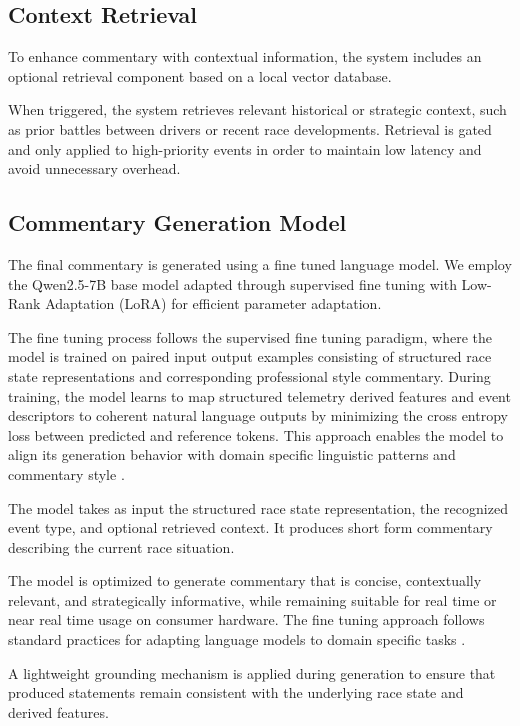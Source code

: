 \subsection{Context Retrieval}

To enhance commentary with contextual information, the system includes an optional retrieval component based on a local vector database.

When triggered, the system retrieves relevant historical or strategic context, such as prior battles between drivers or recent race developments. Retrieval is gated and only applied to high-priority events in order to maintain low latency and avoid unnecessary overhead.

\subsection{Commentary Generation Model}

The final commentary is generated using a fine tuned language model. We employ the Qwen2.5-7B base model adapted through supervised fine tuning with Low-Rank Adaptation (LoRA) for efficient parameter adaptation.

The fine tuning process follows the supervised fine tuning paradigm, where the model is trained on paired input output examples consisting of structured race state representations and corresponding professional style commentary. During training, the model learns to map structured telemetry derived features and event descriptors to coherent natural language outputs by minimizing the cross entropy loss between predicted and reference tokens. This approach enables the model to align its generation behavior with domain specific linguistic patterns and commentary style \cite{SFT}.

The model takes as input the structured race state representation, the recognized event type, and optional retrieved context. It produces short form commentary describing the current race situation.

The model is optimized to generate commentary that is concise, contextually relevant, and strategically informative, while remaining suitable for real time or near real time usage on consumer hardware. The fine tuning approach follows standard practices for adapting language models to domain specific tasks \cite{SFT}.

A lightweight grounding mechanism is applied during generation to ensure that produced statements remain consistent with the underlying race state and derived features.

